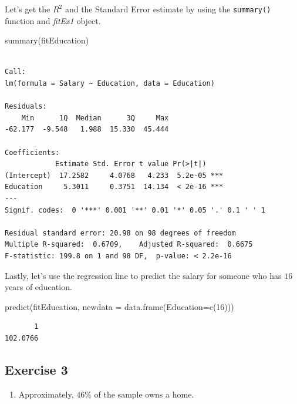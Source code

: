 \documentclass[
  letterpaper,
  DIV=11,
  numbers=noendperiod]{scrreprt}
\newenvironment{Shaded}{\begin{snugshade}}{\end{snugshade}}
\newcommand{\AttributeTok}[1]{\textcolor[rgb]{0.40,0.45,0.13}{#1}}
\newcommand{\DecValTok}[1]{\textcolor[rgb]{0.68,0.00,0.00}{#1}}
\newcommand{\FunctionTok}[1]{\textcolor[rgb]{0.28,0.35,0.67}{#1}}
\newcommand{\NormalTok}[1]{\textcolor[rgb]{0.00,0.23,0.31}{#1}}
\providecommand{\tightlist}{%
  \setlength{\itemsep}{0pt}\setlength{\parskip}{0pt}}\usepackage{longtable,booktabs,array}
\begin{document}
Let's get the \(R^2\) and the Standard Error estimate by using the
\texttt{summary()} function and \emph{fitEx1} object.

\begin{Shaded}
\begin{Highlighting}[numbers=left,,]
\FunctionTok{summary}\NormalTok{(fitEducation)}
\end{Highlighting}
\end{Shaded}

\begin{verbatim}

Call:
lm(formula = Salary ~ Education, data = Education)

Residuals:
    Min      1Q  Median      3Q     Max 
-62.177  -9.548   1.988  15.330  45.444 

Coefficients:
            Estimate Std. Error t value Pr(>|t|)    
(Intercept)  17.2582     4.0768   4.233  5.2e-05 ***
Education     5.3011     0.3751  14.134  < 2e-16 ***
---
Signif. codes:  0 '***' 0.001 '**' 0.01 '*' 0.05 '.' 0.1 ' ' 1

Residual standard error: 20.98 on 98 degrees of freedom
Multiple R-squared:  0.6709,    Adjusted R-squared:  0.6675 
F-statistic: 199.8 on 1 and 98 DF,  p-value: < 2.2e-16
\end{verbatim}

Lastly, let's use the regression line to predict the salary for someone
who has \(16\) years of education.

\begin{Shaded}
\begin{Highlighting}[numbers=left,,]
\FunctionTok{predict}\NormalTok{(fitEducation, }\AttributeTok{newdata =} \FunctionTok{data.frame}\NormalTok{(}\AttributeTok{Education=}\FunctionTok{c}\NormalTok{(}\DecValTok{16}\NormalTok{)))}
\end{Highlighting}
\end{Shaded}

\begin{verbatim}
       1 
102.0766 
\end{verbatim}

\hypertarget{exercise-3-13}{%
\subsection*{Exercise 3}\label{exercise-3-13}}

\begin{enumerate}
\def\labelenumi{\arabic{enumi}.}
\tightlist
\item
  Approximately, \(46\)\% of the sample owns a home.
\end{enumerate}
\end{document}

